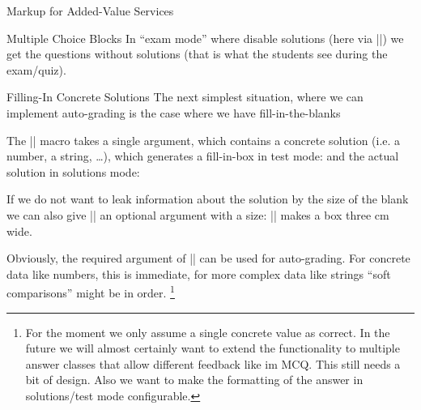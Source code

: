 \begin{sfragment}{Markup for Added-Value Services}
\begin{sfragment}{Multiple Choice Blocks}
In ``exam mode'' where disable solutions (here via |\stopsolutions|)
we get the questions without solutions (that is what the students see during the
exam/quiz).
\end{sfragment}

\begin{sfragment}{Filling-In Concrete Solutions}
The next simplest situation, where we can implement auto-grading is the case where we
have fill-in-the-blanks 

\begin{function}{\fillinsol}
  The |\fillinsol| macro takes a single argument, which contains a concrete solution
  (i.e. a number, a string, \ldots), which generates a fill-in-box in test mode:
 and the actual solution in solutions mode:   
\end{function}
If we do not want to leak information about the solution by the size of the blank we can
also give |\fillinsol| an optional argument with a size: || makes a box
 three cm wide. 

 Obviously, the required argument of |\fillinsol| can be used for auto-grading. For
 concrete data like numbers, this is immediate, for more complex data like strings ``soft
 comparisons'' might be in order. \footnote{For the moment we only assume a single concrete
   value as correct. In the future we will almost certainly want to extend the
   functionality to multiple answer classes that allow different feedback like im
   MCQ. This still needs a bit of design. Also we want to make the formatting of the
   answer in solutions/test mode configurable.}
\end{sfragment}
\end{sfragment}

